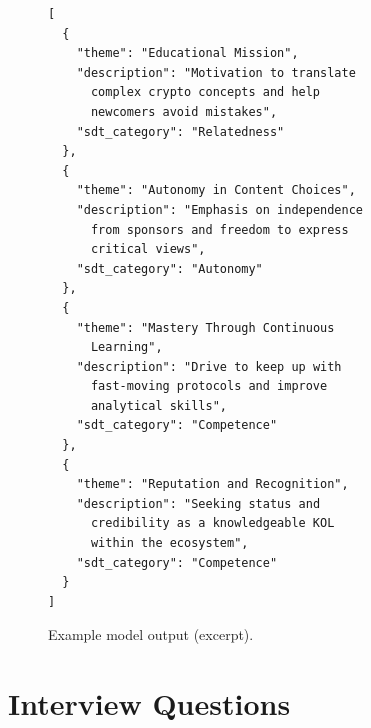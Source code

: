 \begin{figure}[H]
\caption{Example model output (excerpt).}\label{lst:ai-output}
\centering
\begin{minipage}{0.82\columnwidth}
\begin{Verbatim}[frame=single,fontsize=\scriptsize]
[
  {
    "theme": "Educational Mission",
    "description": "Motivation to translate
      complex crypto concepts and help
      newcomers avoid mistakes",
    "sdt_category": "Relatedness"
  },
  {
    "theme": "Autonomy in Content Choices",
    "description": "Emphasis on independence
      from sponsors and freedom to express
      critical views",
    "sdt_category": "Autonomy"
  },
  {
    "theme": "Mastery Through Continuous
      Learning",
    "description": "Drive to keep up with
      fast-moving protocols and improve
      analytical skills",
    "sdt_category": "Competence"
  },
  {
    "theme": "Reputation and Recognition",
    "description": "Seeking status and
      credibility as a knowledgeable KOL
      within the ecosystem",
    "sdt_category": "Competence"
  }
]
\end{Verbatim}
\end{minipage}
\end{figure}

\vfill

\section{Interview Questions}\label{app:interview-questions}

